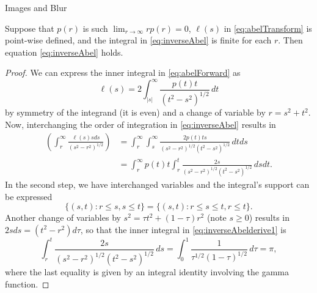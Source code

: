 \begin{chapter}{Images and Blur}
  \begin{prop}
    Suppose that $p(r)$ is such $\lim_{r\to\infty}rp(r) = 0$, $\ell(s)$ in \eqref{eq:abelTransform} is point-wise defined, and the integral in \eqref{eq:inverseAbel} is finite for each $r$. 
    Then equation \eqref{eq:inverseAbel} holds.
  \end{prop}
  \begin{proof}
  We can express the inner integral in \eqref{eq:abelForward} as
  \begin{equation}
    \ell(s) = 2\int_{|s|}^\infty \frac{p(t) t}{(t^2 - s^2)^{1/2}}\,dt \label{eq:abelForward2}
  \end{equation}
  by symmetry of the integrand (it is even) and a change of variable by $r = s^2 + t^2$.
  Now, interchanging the order of integration in \eqref{eq:inverseAbel} results in
  \begin{align} 
    \left(\int_r^\infty \frac{\ell(s) s ds}{ (s^2 - r^2)^{1/2} } \right)  
    &= \int_r^\infty\int_s^\infty \frac{2p(t) ts}{(s^2 - r^2)^{1/2}(t^2 - s^2)^{1/2}}\,dtds \nonumber\\
    &= \int_r^\infty p(t) t\int_r^t \frac{2s}{(s^2 - r^2)^{1/2}(t^2 - s^2)^{1/2}}\,dsdt. \label{eq:inverseAbelderive1}
  \end{align} 
  In the second step, we have interchanged variables and the integral's support can be expressed 
  \begin{equation} \label{eq:inverseAbleSupport}
    \{(s,t): r \le s, s\le t\} = \{(s,t): r\le s \le t, r\le t \}.
  \end{equation}
  Another change of variables by $s^2 = \tau t^2 + (1-\tau)r^2$ (note $s\ge0$) results in $2sds = (t^2 - r^2)d\tau$, 
  so that the inner integral in \eqref{eq:inverseAbelderive1} is
  \begin{equation}
    \int_r^t \frac{2s}{(s^2 - r^2)^{1/2}(t^2 - s^2)^{1/2}}\,ds
    = \int_0^1 \frac {1}{\tau^{1/2}(1-\tau)^{1/2}}\,d\tau = \pi, \label{eq:gammaIntegral}
  \end{equation}
  where the last equality is given by an integral identity involving the gamma function.

\end{proof}
\end{chapter}
